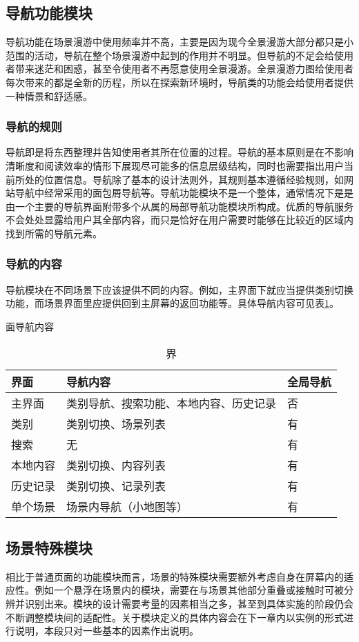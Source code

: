 \subsection{导航功能模块}
导航功能在场景漫游中使用频率并不高，主要是因为现今全景漫游大部分都只是小范围的活动，导航在整个场景漫游中起到的作用并不明显。但导航的不足会给使用者带来迷茫和困惑，甚至令使用者不再愿意使用全景漫游。全景漫游力图给使用者每次带来的都是全新的历程，所以在探索新环境时，导航类的功能会给使用者提供一种情景和舒适感。

\subsubsection{导航的规则}
导航即是将东西整理并告知使用者其所在位置的过程。导航的基本原则是在不影响清晰度和阅读效率的情形下展现尽可能多的信息层级结构，同时也需要指出用户当前所处的位置信息。导航除了基本的设计法则外，其规则基本遵循经验规则，如网站导航中经常采用的面包屑导航等。导航功能模块不是一个整体，通常情况下是是由一个主要的导航界面附带多个从属的局部导航功能模块所构成。优质的导航服务不会处处显露给用户其全部内容，而只是恰好在用户需要时能够在比较近的区域内找到所需的导航元素。

\subsubsection{导航的内容}
导航模块在不同场景下应该提供不同的内容。例如，主界面下就应当提供类别切换功能，而场景界面里应提供回到主屏幕的返回功能等。具体导航内容可见表\ref{tab:nav}。

\begin{table}[htbp]
\centering
\caption 界面导航内容
\vskip 5pt
\begin{tabular}{lll}
\toprule
界面 & 导航内容 & 全局导航\\
\midrule
主界面 & 类别导航、搜索功能、本地内容、历史记录 & 否\\
类别 & 类别切换、场景列表 & 有 \\
搜索 & 无 & 有 \\
本地内容 & 类别切换、内容列表 & 有 \\
历史记录 & 类别切换、记录列表 & 有 \\
单个场景 & 场景内导航（小地图等） & 有 \\
\bottomrule
\end{tabular}
\label{tab:nav}
\end{table}

\subsection{场景特殊模块}
相比于普通页面的功能模块而言，场景的特殊模块需要额外考虑自身在屏幕内的适应性。例如一个悬浮在场景内的模块，需要在与场景其他部分重叠或接触时可被分辨并识别出来。模块的设计需要考量的因素相当之多，甚至到具体实施的阶段仍会不断调整模块间的适配性。关于模块定义的具体内容会在下一章内以实例的形式进行说明，本段只对一些基本的因素作出说明。

